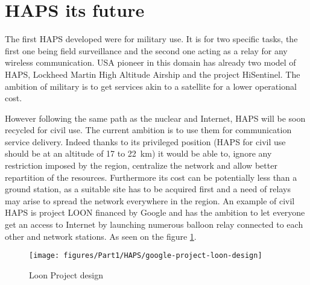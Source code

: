 \section{HAPS its future}
The first HAPS developed were for military use. It is for two specific tasks, the first one being field surveillance and the second one acting as a relay for any wireless communication. USA pioneer in this domain has already two model of HAPS, Lockheed Martin High Altitude Airship and the project HiSentinel. The ambition of military is to get services akin to a satellite for a lower operational cost.

However following the same path as the nuclear and Internet, HAPS will be soon recycled for civil use. The current ambition is to use them for communication service delivery. Indeed thanks to its privileged position (HAPS for civil use should be at an altitude of 17 to \SI{22}{km}) it would be able to, ignore any restriction imposed by the region, centralize the network and allow better repartition of the resources. Furthermore its cost can  be potentially less than a ground station, as a suitable site has to be acquired first and a need of relays may arise to spread the network everywhere in the region.
An example of civil HAPS is project LOON financed by Google and has the ambition to let everyone get an access to Internet by launching numerous balloon relay connected to each other and network stations.
As seen on the figure \ref{fig:LoonProject}.

\begin{figure} [h!]
	\centering
	\texttt{[image: figures/Part1/HAPS/google-project-loon-design]}
	\caption{Loon Project design}
	\label{fig:LoonProject}
\end{figure}
